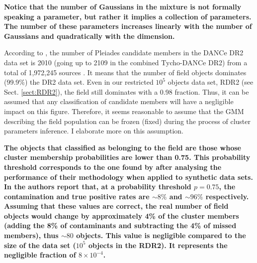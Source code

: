 \textbf{Notice that the number of Gaussians in the mixture is not formally speaking a parameter, but rather it implies a collection of parameters. The number of these parameters increases linearly with the number of Gaussians and quadratically with the dimension.} 

According to \citet{Bouy2015}, the number of Pleiades candidate members in the DANCe DR2 data set is 2010 (going up to 2109 in the combined Tycho-DANCe DR2) from a total of 1,972,245 sources . It means that the number of field objects dominates (99.9\%) the DR2 data set. Even in our restricted $10^5$ objects data set, RDR2 (see Sect. \ref{sect:RDR2}), the field still dominates with a 0.98 fraction. Thus, it can be assumed that any classification of candidate members will have a negligible impact on this figure. Therefore, it seems reasonable to assume that the GMM describing the field population can be frozen (fixed) during the process of cluster parameters inference. I elaborate more on this assumption.


\textbf{The objects that \citet{Bouy2015} classified as belonging to the field are those whose cluster membership probabilities are lower than 0.75. This probability threshold corresponds to the one found by \citet{Sarro2014} after analysing the performance of their methodology when applied to synthetic data sets. In \citet{Sarro2014} the authors report that, at a probability threshold $p=0.75$, the contamination and true positive rates are $\sim 8\%$ and $ \sim96\%$ respectively. Assuming that these values are correct, the real number of field objects would change by approximately 4\% of the cluster members (adding the 8\% of contaminants and subtracting the 4\% of missed members), thus $\sim 80$ objects. This value is negligible compared to the size of the data set ($10^5$ objects in the RDR2). It represents the negligible fraction of $ 8\times10^{-4}$. }

